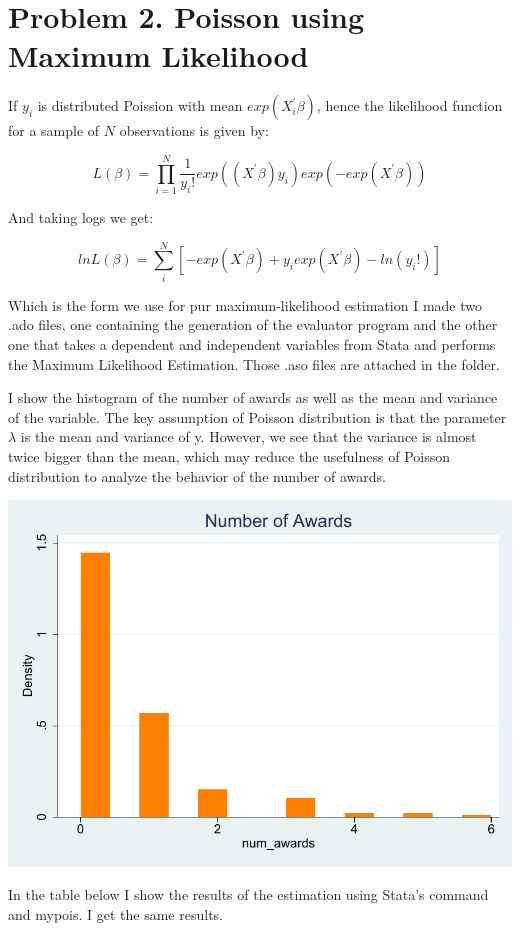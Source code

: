\documentclass[12pt]{article}
\begin{document}
\section{Problem 2. Poisson using Maximum Likelihood}

If $y_i$ is distributed Poission with mean $exp(X^{'}_i \beta)$, hence the likelihood function for a sample of $N$ observations is given by:

$$ L(\beta)=\prod_{i=1}^{N}\frac{1}{y_{i}!}exp((X^{'}\beta)y_i)exp(-exp(X^{'}\beta))$$


And taking logs we get:

$$lnL(\beta)=\sum_{i}^{N}[-exp(X^{'}\beta)+y_i exp(X^{'}\beta)-ln(y_i !)]$$

Which is the form we use for pur maximum-likelihood estimation
I made two .ado files, one containing the generation of the evaluator program and the other one that takes a dependent and independent variables from Stata and performs the Maximum Likelihood Estimation. Those .aso files are attached in the folder. 

I show the histogram of the number of awards as well as the mean and variance of the variable. The key assumption of Poisson distribution is that the parameter $\lambda$ is the mean and variance of y. However, we see that the variance is almost twice bigger than the mean, which may reduce the usefulness of Poisson distribution to analyze the behavior of the number of awards. 

\begin{stlog}\end{stlog}
\begin{center}
    \includegraphics{797B_PS1_JL_5.pdf}
\end{center}
In the table below I show the results of the estimation using Stata's command and mypois. I get the same results.


\pagebreak
\end{document}
